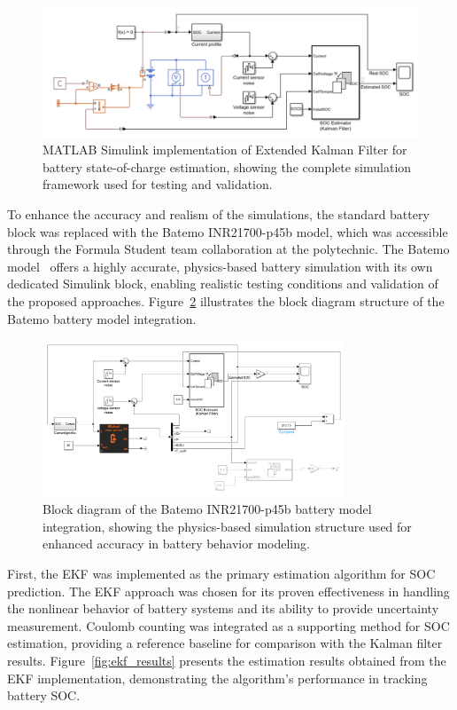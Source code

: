 \begin{figure}[htbp]
\centering
\includegraphics[width=1\textwidth]{imgs/simulink_EKF.png}
\caption{MATLAB Simulink implementation of Extended Kalman Filter for battery state-of-charge estimation, showing the complete simulation framework used for testing and validation.}
\label{fig:simulink_ekf_implementation}
\end{figure}

To enhance the accuracy and realism of the simulations, the standard battery block was replaced with the Batemo INR21700-p45b model, which was accessible through the Formula Student team collaboration at the polytechnic. The Batemo model~\cite{batemo_website_2024} offers a highly accurate, physics-based battery simulation with its own dedicated Simulink block, enabling realistic testing conditions and validation of the proposed approaches. Figure~\ref{fig:batemo_blocks} illustrates the block diagram structure of the Batemo battery model integration.

\begin{figure}[htbp]
\centering
\includegraphics[width=0.8\textwidth]{imgs/batemo_blocks.png}
\caption{Block diagram of the Batemo INR21700-p45b battery model integration, showing the physics-based simulation structure used for enhanced accuracy in battery behavior modeling.}
\label{fig:batemo_blocks}
\end{figure}

First, the EKF was implemented as the primary estimation algorithm for SOC prediction. The EKF approach was chosen for its proven effectiveness in handling the nonlinear behavior of battery systems and its ability to provide uncertainty measurement. Coulomb counting was integrated as a supporting method for SOC estimation, providing a reference baseline for comparison with the Kalman filter results. Figure~\ref{fig:ekf_results} presents the estimation results obtained from the EKF implementation, demonstrating the algorithm's performance in tracking battery SOC.


